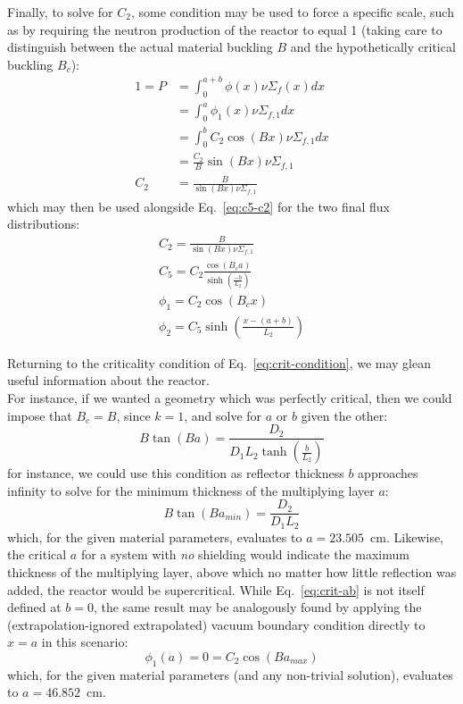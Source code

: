 \documentclass[12pt]{article}
\begin{document}
Finally, to solve for $C_2$, some condition may be used to force a specific scale, such as by requiring the neutron production of the reactor to equal 1 (taking care to distinguish between the actual material buckling $B$ and the hypothetically critical buckling $B_c$):
\begin{equation}
    \label{eq:production-force}
    \begin{aligned}
        1=P&=\int_{0}^{a+b}\phi(x)\nu\Sigma_f(x)dx\\
        &=\int_{0}^{a}\phi_1(x)\nu\Sigma_{f,1}dx\\
        &=\int_{0}^{b}C_2\cos(Bx)\nu\Sigma_{f,1}dx\\
        &=\frac{C_2}{B}\sin(Bx)\nu\Sigma_{f,1}\\
        C_2&=\frac{B}{\sin(Bx)\nu\Sigma_{f,1}}
    \end{aligned}
\end{equation}
which may then be used alongside Eq.~\ref{eq:c5-c2} for the two final flux distributions:
\begin{equation}
    \label{eq:p3-dists}
    \begin{gathered}
        C_2=\frac{B}{\sin(Bx)\nu\Sigma_{f,1}}\\
        C_5=C_2\frac{\cos(B_ca)}{\sinh(\frac{-b}{L_2})}\\
        \phi_1= C_2\cos(B_cx)\\
        \phi_2=C_5\sinh(\frac{x-(a+b)}{L_2})
    \end{gathered}
\end{equation}

Returning to the criticality condition of Eq.~\ref{eq:crit-condition}, we may glean useful information about the reactor.\\

For instance, if we wanted a geometry which was perfectly critical, then we could impose that $B_c=B$, since $k=1$, and solve for $a$ or $b$ given the other:
\begin{equation}
    \label{eq:crit-ab}
    B\tan(Ba) = \frac{D_2}{D_1L_2\tanh(\frac{b}{L_2})}
\end{equation}
for instance, we could use this condition as reflector thickness $b$ approaches infinity to solve for the minimum thickness of the multiplying layer $a$:
\begin{equation}
    \label{eq:min-a}
    B\tan(Ba_{min}) = \frac{D_2}{D_1L_2}
\end{equation}
which, for the given material parameters, evaluates to $a=23.505$~cm.
Likewise, the critical $a$ for a system with \emph{no} shielding would indicate the maximum thickness of the multiplying layer, above which no matter how little reflection was added, the reactor would be supercritical.
While Eq.~\ref{eq:crit-ab} is not itself defined at $b=0$, the same result may be analogously found by applying the (extrapolation-ignored extrapolated) vacuum boundary condition directly to $x=a$ in this scenario:
\begin{equation}
    \label{eq:max-a}
    \phi_1(a)=0=C_2\cos\left(Ba_{max}\right) 
\end{equation}
which, for the given material parameters (and any non-trivial solution), evaluates to $a=46.852$~cm.\\
\end{document}
